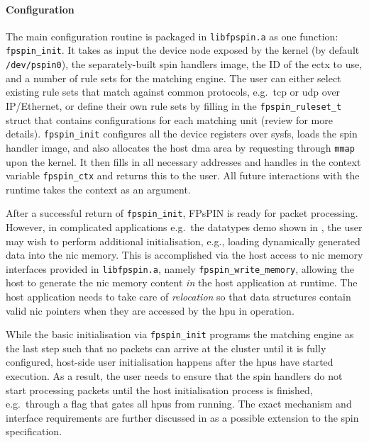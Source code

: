 \paragraph{Configuration} The main configuration routine is packaged in \texttt{libfpspin.a} as one function: \texttt{fpspin\_init}.  It takes as input the device node exposed by the kernel (by default \texttt{/dev/pspin0}), the separately-built \ac{spin} handlers image, the ID of the \ac{ectx} to use, and a number of rule sets for the matching engine.  The user can either select existing rule sets that match against common protocols, e.g.\ \ac{tcp} or \ac{udp} over IP/Ethernet, or define their own rule sets by filling in the \texttt{fpspin\_\-ruleset\_\-t} struct that contains configurations for each matching unit (review  for more details).  \texttt{fpspin\_init} configures all the device registers over sysfs, loads the \ac{spin} handler image, and also allocates the host \ac{dma} area by requesting through \texttt{mmap} upon the kernel.  It then fills in all necessary addresses and handles in the context variable \texttt{fpspin\_\-ctx} and returns this to the user.  All future interactions with the runtime takes the context as an argument.

After a successful return of \texttt{fpspin\_\-init}, FPsPIN is ready for packet processing.  However, in complicated applications e.g.\ the datatypes demo shown in ,  the user may wish to perform additional initialisation, e.g., loading dynamically generated data into the \ac{nic} memory.  This is accomplished via the host access to \ac{nic} memory interfaces provided in \texttt{libfpspin.a}, namely \texttt{fpspin\_write\_memory}, allowing the host to generate the \ac{nic} memory content \emph{in} the host application at runtime.  The host application needs to take care of \emph{relocation} so that data structures contain valid \ac{nic} pointers when they are accessed by the \ac{hpu} in operation.

While the basic initialisation via \texttt{fpspin\_\-init} programs the matching engine as the last step such that no packets can arrive at the cluster until it is fully configured, host-side user initialisation happens after the \ac{hpu}s have started execution.  As a result, the user needs to ensure that the \ac{spin} handlers do not start processing packets until the host initialisation process is finished, e.g.\ through a flag that gates all \ac{hpu}s from running.  The exact mechanism and interface requirements are further discussed in  as a possible extension to the \ac{spin} specification.

